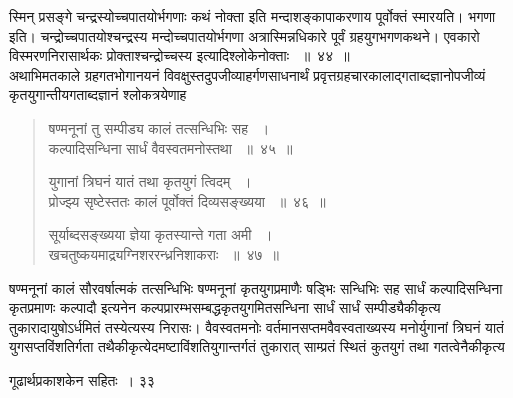 \documentclass[11pt, openany]{book}
\begin{document}
\begin{sloppypar}
\noindent स्मिन् प्रसङ्गे चन्द्रस्योच्चपातयोर्भगणाः कथं नोक्ता इति मन्दाशङ्कापाकरणाय पूर्वोक्तं स्मारयति। भगणा इति। चन्द्रोच्चपातयोश्चन्द्रस्य मन्दोच्चपातयोर्भगणा अत्रास्मिन्नधिकारे पूर्वं ग्रहयुगभगणकथने। एवकारो विस्मरणनिरासार्थकः प्रोक्ताश्चन्द्रोच्चस्य इत्यादिश्लोकेनोक्ताः ~॥~४४~॥\\
\noindent अथाभिमतकाले ग्रहगतभोगानयनं विवक्षुस्तदुपजीव्याहर्गणसाधनार्थं प्रवृत्तग्रहचारकालाद्गताब्दज्ञानोपजीव्यं कृतयुगान्तीयगताब्दज्ञानं श्लोकत्रयेणाह\textendash
\end{sloppypar}
\begin{quote}

  {\ssi षण्मनूनां तु सम्पीड्य कालं तत्सन्धिभिः सह ~।\\
कल्पादिसन्धिना सार्धं वैवस्वतमनोस्तथा ~॥~४५~॥

युगानां त्रिघनं यातं तथा कृतयुगं त्विदम् ~।\\
प्रोज्झ्य सृष्टेस्ततः कालं पूर्वोक्तं दिव्यसङ्ख्यया ~॥~४६~॥

सूर्याब्दसङ्ख्यया ज्ञेया कृतस्यान्ते गता अमी ~।\\
खचतुष्कयमाद्र्यग्निशररन्ध्रनिशाकराः ~॥~४७~॥}
\end{quote}
\begin{sloppypar}
 षण्मनूनां कालं सौरवर्षात्मकं तत्सन्धिभिः षण्मनूनां कृतयुगप्रमाणैः षड्भिः सन्धिभिः सह सार्धं कल्पादिसन्धिना कृतप्रमाणः कल्पादौ इत्यनेन कल्पप्रारम्भसम्बद्धकृतयुगमितसन्धिना सार्धं सार्धं सम्पीड्यैकीकृत्य तुकारादायुषोऽर्धमितं तस्येत्यस्य निरासः। वैवस्वतमनोः वर्तमानसप्तमवैवस्वताख्यस्य मनोर्युगानां त्रिघनं यातं युगसप्तविंशतिर्गता तथैकीकृत्येदमष्टाविंशतियुगान्तर्गतं तुकारात् साम्प्रतं स्थितं कुतयुगं तथा गतत्वेनैकीकृत्य
\end{sloppypar}

\newpage

\hspace{3cm} गूढार्थप्रकाशकेन सहितः~। \hfill ३३
\vspace{1cm}
\end{document}
